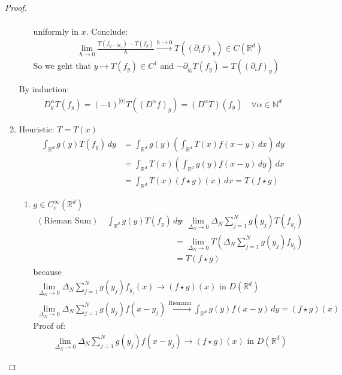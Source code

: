 \documentclass{report}
\theoremstyle{tommy}
\begin{document}
\begin{proof}
\begin{enumerate}[label=\alph*)]
\begin{itemize}
\begin{align*}
        \end{align*}
        uniformly in \(x\). Conclude: 
        \begin{align*}
          \lim_{h \to 0} \frac{T(f_{y - he_i}) - T(f_y)}{h} \xrightarrow{h \to 0} T((\partial_i f)_y) \in C(\mathbb{R}^d)
        \end{align*}
        So we geht that \(y \mapsto T(f_y) \in C^1\) and \(- \partial_{y_i} T(f_y) = T((\partial_i f)_y)\)
      \end{itemize}
      By induction: 
      \begin{align*}
        D_y^\alpha T(f_y) = (-1)^{|\alpha|} T((D^\alpha f)_y) = (D^\alpha T)(f_y) \quad \forall \alpha \in \mathbb{N}^d
      \end{align*}
      \item Heuristic: \(T = T(x)\)
      \begin{align*}
        \int_{\mathbb{R}^d} g(y) T(f_y) \, dy 
        &= \int_{\mathbb{R}^d} g(y) \left(\int_{\mathbb{R}^d}T(x) f(x-y) \, dx \right)\, dy \\
        &= \int_{\mathbb{R}^d} T(x) \left(\int_{\mathbb{R}^d} g(y) f(x-y) \, dy \right) \, dx \\
        &= \int_{\mathbb{R}^d} T(x) (f \star g)(x) \, dx = T(f \star g)
      \end{align*}
      \begin{enumerate}[label=Step \arabic*:]
        \item \(g \in C_c^\infty(\mathbb{R}^d)\) \begin{align*}
          (\text{Rieman Sum}) \quad \int_{\mathbb{R}^d} g(y) T(f_y) \, dy 
          &= \lim_{\Delta_N \to 0} \Delta_N \sum_{j=1}^N g(y_j) T(f_{y_j}) \\
          &= \lim_{\Delta_N \to 0} T\left(\Delta_N \sum_{j=1}^N g(y_j) f_{y_j}\right) \\
          &= T(f\star g)
        \end{align*}
        because
        \begin{align*}
          \lim_{\Delta_N \to 0} \Delta_N \sum_{j=1}^N g(y_j) f_{y_j} (x) \to (f\star g)(x) \text{ in } D(\mathbb{R}^d) \\
          \lim_{\Delta_N \to 0} \Delta_N \sum_{j=1}^N g(y_j) f(x-y_j) \xrightarrow{\text{Riemann}} \int_{\mathbb{R}^d} g(y) f(x-y) \, dy = (f \star g)(x)
        \end{align*}
        Proof of: 
        \begin{align*}
          \lim_{\Delta_N \to 0} \Delta_N \sum_{j=1}^N g(y_j) f(x-y_j) \to (f\star g)(x) \text{ in } D(\mathbb{R}^d)

\end{align*}
\end{enumerate}
\end{enumerate}
\end{proof}
\end{document}
